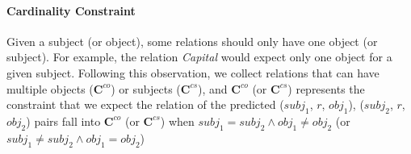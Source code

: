 \paragraph{Cardinality Constraint}
Given a subject (or object), some relations should only have one object (or subject).
For example, the relation \emph{Capital} would expect only one object for a given subject.
Following this observation, we collect relations that can have multiple objects ($\textbf{C}^{co}$) or subjects ($\textbf{C}^{cs}$),
and $\textbf{C}^{co}$ (or $\textbf{C}^{cs}$) represents the constraint that we expect the relation of the predicted ($subj_1$, $r$, $obj_1$),  ($subj_2$, $r$, $obj_2$) pairs fall into $\textbf{C}^{co}$ (or $\textbf{C}^{cs}$) when $subj_1=subj_2 \land obj_1\neq obj_2$ (or $subj_1\neq subj_2 \land obj_1=obj_2$)


